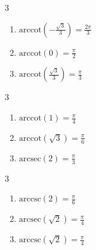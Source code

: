 \documentclass{ximera}
\begin{document}
\begin{multicols}{3} 

\begin{enumerate}

\setcounter{enumi}{\value{HW}}

\item $\mbox{arccot} \left( -\frac{\sqrt{3}}{3} \right) = \frac{2\pi}{3}$
\item $\mbox{arccot} \left( 0 \right) = \frac{\pi}{2}$ 
\item $\mbox{arccot} \left( \frac{\sqrt{3}}{3} \right) = \frac{\pi}{3}$

\setcounter{HW}{\value{enumi}}

\end{enumerate}

\end{multicols}

\begin{multicols}{3} 

\begin{enumerate}

\setcounter{enumi}{\value{HW}}

\item $\mbox{arccot} \left( 1 \right) = \frac{\pi}{4}$
\item $\mbox{arccot} \left( \sqrt{3} \right) = \frac{\pi}{6}$
\item $\mbox{arcsec} \left( 2 \right) = \frac{\pi}{3}$

\setcounter{HW}{\value{enumi}}

\end{enumerate}

\end{multicols}

\begin{multicols}{3} 

\begin{enumerate}

\setcounter{enumi}{\value{HW}}

\item $\mbox{arccsc} \left( 2 \right) = \frac{\pi}{6}$
\item $\mbox{arcsec} \left( \sqrt{2} \right) = \frac{\pi}{4}$
\item $\mbox{arccsc} \left( \sqrt{2} \right) = \frac{\pi}{4}$

\setcounter{HW}{\value{enumi}}

\end{enumerate}

\end{multicols}
\end{document}
